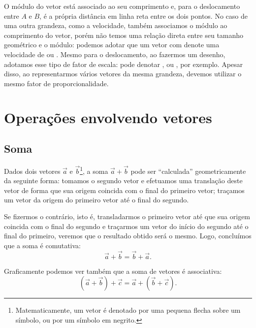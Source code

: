 O módulo do vetor está associado ao seu comprimento e, para o deslocamento entre $A$ e $B$, é a própria distância em linha reta entre os dois pontos. No caso de uma outra grandeza, como a velocidade, também associamos o módulo ao comprimento do vetor, porém não temos uma relação direta entre seu tamanho geométrico e o módulo: podemos adotar que um vetor com  denote uma velocidade de  ou . Mesmo para o deslocamento, ao fazermos um desenho, adotamos esse tipo de fator de escala:  pode denotar , ou , por exemplo. Apesar disso, ao representarmos vários vetores da mesma grandeza, devemos utilizar o mesmo fator de proporcionalidade.

\section{Operações envolvendo vetores}

\subsection{Soma}

Dados dois vetores $\vec{a}$ e $\vec{b}$\footnote{Matematicamente, um vetor é denotado por uma pequena flecha sobre um símbolo, ou por um símbolo em negrito.}, a soma $\vec{a}+\vec{b}$ pode ser ``calculada'' geometricamente da seguinte forma: tomamos o segundo vetor e efetuamos uma translação deste vetor de forma que sua origem coincida com o final do primeiro vetor; traçamos um vetor da origem do primeiro vetor até o final do segundo. 

Se fizermos o contrário, isto é, transladarmos o primeiro vetor até que sua origem coincida com o final do segundo e traçarmos um vetor do início do segundo até o final do primeiro, veremos que o resultado obtido será o mesmo. Logo, concluímos que a soma é comutativa:
\begin{equation}
  \vec{a} + \vec{b} = \vec{b} + \vec{a}.
\end{equation}

Graficamente podemos ver também que a soma de vetores é associativa:
\begin{equation}
  (\vec{a}+\vec{b}) + \vec{c} = \vec{a} + (\vec{b} + \vec{c}).
\end{equation}

